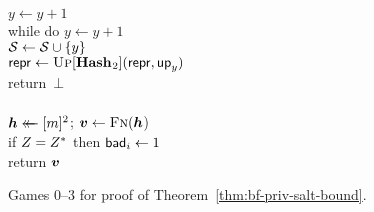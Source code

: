 \begin{figure}
{      $y \gets y+1$\\
      while do $y \gets y+1$\\
      $\mathcal{S} \gets \mathcal{S} \cup \{y\}$\\
      $\mathsf{repr} \gets \textsc{Up}[\mathbf{Hash}\hspace{0.5pt}_2](\mathsf{repr},\mathsf{up}_y)$\\
      return~$\bot$
    \\[6pt]
    \\[2pt]
      $\hh \getsr [m]^2$; $\vv \gets \fff(\hh$)\\
      if $Z = Z^*$ then $\mathsf{bad}_i \gets 1$\\
      return $\vv$
  }
  \caption{Games 0--3 for proof of Theorem~\ref{thm:bf-priv-salt-bound}.}
  \label{fig:bf-priv-salt-bound}
\end{figure}